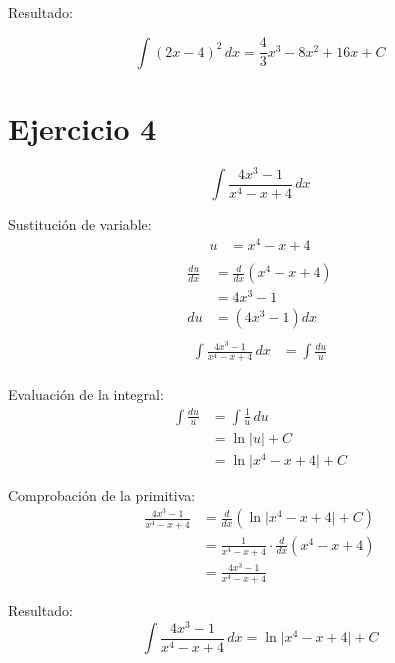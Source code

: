 \documentclass[12pt]{article}
\begin{document}
Resultado:

\[ \int (2x - 4)^{2} \, dx = \frac{4}{3}x^{3} -8x^{2} + 16x + C \]
\newpage

\section*{Ejercicio 4}

\[ \int \frac{4x^{3} - 1}{x^{4} - x + 4} \, dx \]

Sustitución de variable:
\begin{align*}
	u &= x^{4} - x + 4 \\
\end{align*}
\begin{align*}
	\frac{du}{dx} &= \frac{d}{dx} \left( x^{4} - x + 4 \right) \\
	&= 4x^{3} - 1 \\
	du &= \left ( 4x^{3} - 1 \right) dx \\
\end{align*}
\begin{align*}
	\int \frac{4x^{3} - 1}{x^{4} - x + 4} \, dx &= \int \frac{du}{u}\\
\end{align*}

Evaluación de la integral:
\begin{align*}
	\int \frac{du}{u} &= \int \frac{1}{u} \, du \\
	&= \ln \lvert u \rvert + C \\
	&= \ln \lvert x^{4} - x + 4 \rvert + C
\end{align*}

Comprobación de la primitiva:
\begin{align*}
	\frac{4x^{3} - 1}{x^{4} - x + 4} &= \frac{d}{dx} \left( \ln \lvert x^{4} - x + 4 \rvert + C\right) \\
	&= \frac{1}{x^{4} - x + 4} \cdot \frac{d}{dx} \left( x^{4} - x + 4 \right) \\
	&= \frac{4x^{3} - 1}{x^{4} - x + 4}
\end{align*}

Resultado:
\[ \int \frac{4x^{3} - 1}{x^{4} - x + 4} \, dx = \ln \lvert x^{4} - x + 4 \rvert + C \]
\newpage
\end{document}
